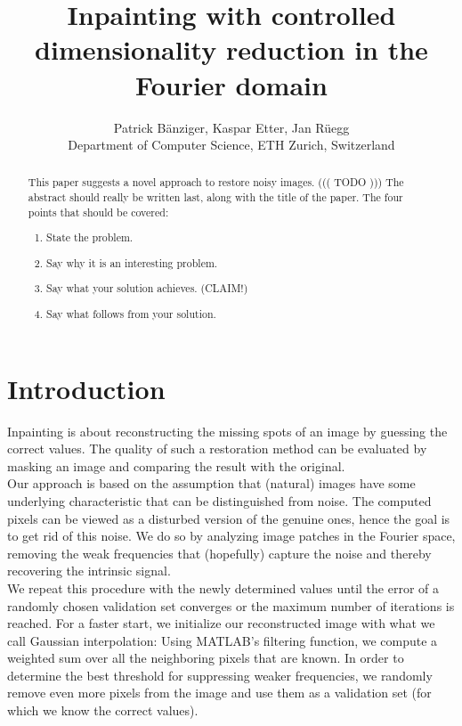 \documentclass[10pt,conference,compsocconf]{IEEEtran}
\begin{document}
\title{Inpainting with controlled dimensionality reduction in the Fourier domain}

\author{
  Patrick Bänziger, Kaspar Etter, Jan Rüegg\\
  Department of Computer Science, ETH Zurich, Switzerland
}

\maketitle

\begin{abstract}
  This paper suggests a novel approach to restore noisy images.
  ((( TODO )))
  The abstract should really be written last, along with the title of
the paper. The four points that should be covered:
\begin{enumerate}
\item State the problem.
\item Say why it is an interesting problem.
\item Say what your solution achieves. (CLAIM!)
\item Say what follows from your solution.
\end{enumerate}
\end{abstract}

\section{Introduction}
Inpainting is about reconstructing the missing spots of an image by guessing the correct values. The quality of such a restoration method can be evaluated by masking an image and comparing the result with the original.\\
Our approach is based on the assumption that (natural) images have some underlying characteristic that can be distinguished from noise. The computed pixels can be viewed as a disturbed version of the genuine ones, hence the goal is to get rid of this noise. We do so by analyzing image patches in the Fourier space, removing the weak frequencies that (hopefully) capture the noise and thereby recovering the intrinsic signal.\\
We repeat this procedure with the newly determined values until the error of a randomly chosen validation set converges or the maximum number of iterations is reached. For a faster start, we initialize our reconstructed image with what we call Gaussian interpolation: Using MATLAB's filtering function, we compute a weighted sum over all the neighboring pixels that are known. In order to determine the best threshold for suppressing weaker frequencies, we randomly remove even more pixels from the image and use them as a validation set (for which we know the correct values).
\end{document}
